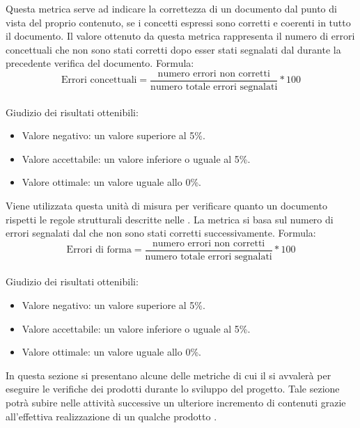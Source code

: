 \documentclass[a4paper, titlepage]{article}
\begin{document}
\label{par:errcon}
Questa metrica serve ad indicare la correttezza di un documento dal punto di vista del proprio contenuto, se i concetti espressi sono corretti e coerenti in tutto il documento.
\newline Il valore ottenuto da questa metrica rappresenta il numero di errori concettuali che non sono stati corretti dopo esser stati segnalati dal  durante la precedente verifica del documento.
\newline Formula:
\begin{displaymath}
\mbox{Errori concettuali}=\frac{\mbox{numero errori non corretti}}{\mbox{numero totale errori segnalati}}*100
\end{displaymath}
\\
\newline Giudizio dei risultati ottenibili:
\begin{itemize}
\item Valore negativo: un valore superiore al 5\%. 
\item Valore accettabile: un valore inferiore o uguale al 5\%.
\item Valore ottimale: un valore uguale allo 0\%.
\end{itemize}

\label{par:errfor}
Viene utilizzata questa unità di misura per verificare quanto un documento rispetti le regole strutturali descritte nelle . 
\newline La metrica si basa sul numero di errori segnalati dal  che non sono stati corretti successivamente.
\newline Formula:
\begin{displaymath}
\mbox{Errori di forma}=\frac{\mbox{numero errori non corretti}}{\mbox{numero totale errori segnalati}}*100
\end{displaymath}
\\
\newline Giudizio dei risultati ottenibili:
\begin{itemize}
\item Valore negativo: un valore superiore al 5\%. 
\item Valore accettabile: un valore inferiore o uguale al 5\%.
\item Valore ottimale: un valore uguale allo 0\%.
\end{itemize}

In questa sezione si presentano alcune delle metriche di cui il  si avvalerà per eseguire le verifiche dei prodotti  durante lo sviluppo del progetto. Tale sezione potrà subire nelle attività successive un ulteriore incremento di contenuti grazie all'effettiva realizzazione di un qualche prodotto . 
\end{document}
